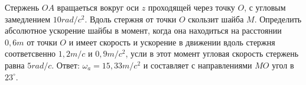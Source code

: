Стержень $OA$ вращаеться вокруг оси $z$ проходящей через точку $O$, с угловым 
замедлением $10 rad/c^2$. Вдоль стержня от точки $O$ скользит шайба $M$.
Определить абсолютное ускорение шайбы в момент, когда она находиться на
расстоянии $0,6 m$ от точки $O$ и имеет скорость  и ускорение в движении 
вдоль стержня соответсвенно $1,2 m/c$ и $0,9 m/c^2$, усли в этот момент
угловая скорость стержень равна $5 rad/c$.
  Ответ: $\omega_{a} = 15,33 m/c^2$ и составляет с направлениями $MO$ 
  угол в $23^{\circ}$.